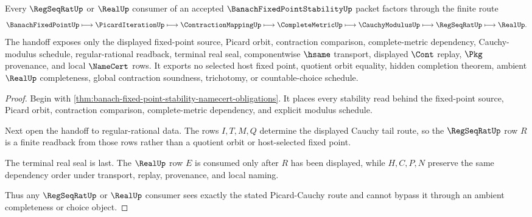 \begin{theorem}
\label{thm:banach-fixed-point-stability-picard-cauchy-handoff}
Every $\RegSeqRatUp$ or $\RealUp$ consumer of an accepted $\BanachFixedPointStabilityUp$ packet factors through the finite route
$$
\BanachFixedPointUp \longmapsto \PicardIterationUp \longmapsto \ContractionMappingUp \longmapsto \CompleteMetricUp \longmapsto \CauchyModulusUp \longmapsto \RegSeqRatUp \longmapsto \RealUp .
$$
The handoff exposes only the displayed fixed-point source, Picard orbit, contraction comparison, complete-metric dependency, Cauchy-modulus schedule, regular-rational readback, terminal real seal, componentwise $\hsame$ transport, displayed $\Cont$ replay, $\Pkg$ provenance, and local $\NameCert$ rows. It exports no selected host fixed point, quotient orbit equality, hidden completion theorem, ambient $\RealUp$ completeness, global contraction soundness, trichotomy, or countable-choice schedule.
\end{theorem}
\begin{proof}
Begin with \autoref{thm:banach-fixed-point-stability-namecert-obligations}. It places every stability read behind the fixed-point source, Picard orbit, contraction comparison, complete-metric dependency, and explicit modulus schedule.

Next open the handoff to regular-rational data. The rows $I,T,M,Q$ determine the displayed Cauchy tail route, so the $\RegSeqRatUp$ row $R$ is a finite readback from those rows rather than a quotient orbit or host-selected fixed point.

The terminal real seal is last. The $\RealUp$ row $E$ is consumed only after $R$ has been displayed, while $H,C,P,N$ preserve the same dependency order under transport, replay, provenance, and local naming.

Thus any $\RegSeqRatUp$ or $\RealUp$ consumer sees exactly the stated Picard-Cauchy route and cannot bypass it through an ambient completeness or choice object.
\end{proof}

